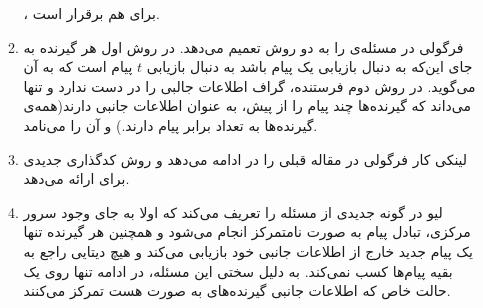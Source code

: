\begin{enumerate}
\begin{enumerate}
 		\icod،
 		برای
 		\picod
 		هم برقرار است.
 		\item 
 		فرگولی در
 		\cite{6620405}
 		مسئله‌ی
 		\picod
 		را به دو روش تعمیم می‌دهد. در روش اول هر گیرنده به جای این‌که به دنبال بازیابی یک پیام باشد به دنبال بازیابی
 		$t$
 		پیام است که به آن
 		می‌گوید.
 		در روش دوم فرستنده، گراف اطلاعات جالبی را در دست ندارد و تنها می‌داند که گیرنده‌ها چند پیام را از پیش، به عنوان اطلاعات جانبی دارند(همه‌ی گیرنده‌ها به تعداد برابر پیام دارند.) و آن را
 		می‌نامد.
 		\item 
 		لینکی کار فرگولی در مقاله قبلی را در
 		\cite{8625330}
 		ادامه می‌دهد و روش کدگذاری جدیدی برای 
 		ارائه می‌دهد.
 		\item 
 		لیو در
 		\cite{9173957}
 		گونه جدیدی از مسئله را تعریف می‌کند که اولا به جای وجود سرور مرکزی، تبادل پیام به صورت نامتمرکز انجام می‌شود و همچنین هر گیرنده تنها یک پیام جدید خارج از اطلاعات جانبی خود بازیابی می‌کند و هیچ دیتایی راجع به بقیه پیام‌ها کسب نمی‌کند. به دلیل سختی این مسئله، در ادامه تنها روی یک حالت خاص که اطلاعات جانبی گیرنده‌های به صورت
 		هست تمرکز می‌کنند.	
 		

\end{enumerate}
\end{enumerate}
